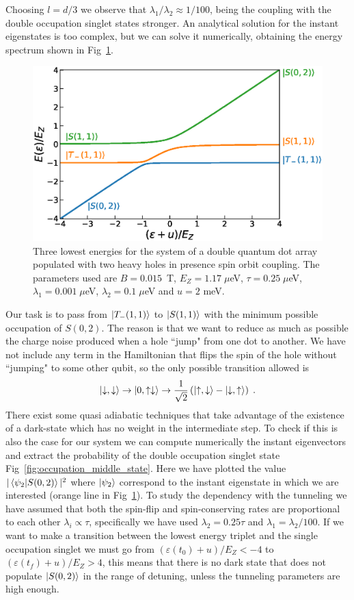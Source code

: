 \documentclass[a4paper,11pt]{article}
\begin{document}
Choosing $l=d/3$ we observe that $\lambda_1/\lambda_2\approx 1/100$, being the coupling with the double occupation singlet states stronger. An analytical solution for the instant eigenstates is too complex, but we can solve it numerically, obtaining the energy spectrum shown in Fig~\ref{fig:eigenenergies_2QD_2HH_w_SOC}.
\begin{figure}[!htbp]
	\centering
	\includegraphics[width=0.8\linewidth]{eigenenergies_2QD_2HH_w_SOC.eps}
	\caption{Three lowest energies for the system of a double quantum dot array populated with two heavy holes in presence spin orbit coupling. The parameters used are $B=0.015$~T, $E_Z=1.17\; \mu$eV, $\tau=0.25\; \mu$eV, $\lambda_1=0.001\; \mu$eV, $\lambda_2=0.1\; \mu$eV and $u=2$ meV.}
	\label{fig:eigenenergies_2QD_2HH_w_SOC}
\end{figure}
Our task is to pass from $\ket{T_-(1,1)}$ to $\ket{S(1,1)}$ with the minimum possible occupation of $S(0,2)$. The reason is that we want to reduce as much as possible the charge noise produced when a hole ``jump" from one dot to another. We have not include any term in the Hamiltonian that flips the spin of the hole without ``jumping" to some other qubit, so the only possible transition allowed is
\begin{equation}
	\ket{\downarrow,\downarrow}\rightarrow \ket{0,\uparrow\downarrow} \rightarrow \frac{1}{\sqrt{2}}\left(\ket{\uparrow,\downarrow}-\ket{\downarrow,\uparrow}\right)\; .
\end{equation}
There exist some quasi adiabatic techniques that take advantage of the existence of a dark-state which has no weight in the intermediate step. To check if this is also the case for our system we can compute numerically the instant eigenvectors and extract the probability of the double occupation singlet state Fig~\ref{fig:occupation_middle_state}. Here we have plotted the value $|\braket{\psi_2}{S(0,2)}|^2$ where $\ket{\psi_2}$ correspond to the instant eigenstate in which we are interested (orange line in Fig~\ref{fig:eigenenergies_2QD_2HH_w_SOC}). To study the dependency with the tunneling we have assumed that both the spin-flip and spin-conserving rates are proportional to each other $\lambda_i\propto \tau$, specifically we have used $\lambda_2=0.25\tau$ and $\lambda_1=\lambda_2/100$. If we want to make a transition between the lowest energy triplet and the single occupation singlet we must go from $(\varepsilon(t_0)+u)/E_Z<-4$ to $(\varepsilon(t_f)+u)/E_Z>4$, this means that there is no dark state that does not populate $\ket{S(0,2)}$ in the range of detuning, unless the tunneling parameters are high enough.
\end{document}
